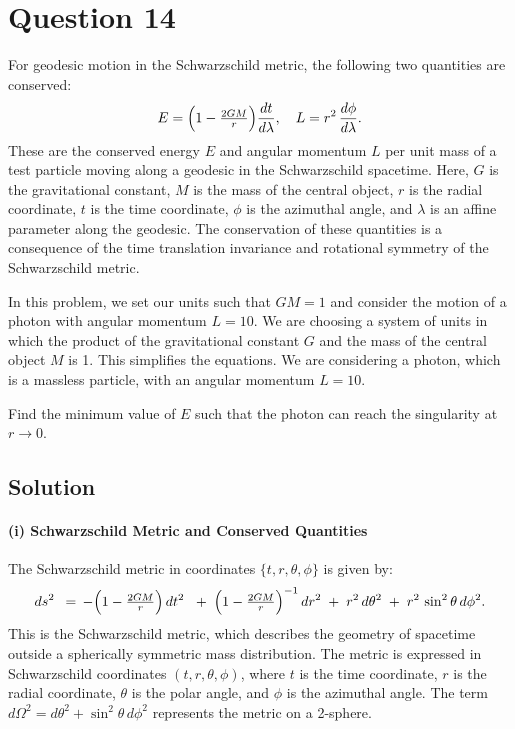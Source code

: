 \documentclass{article}
\begin{document}
\section*{Question 14}
For geodesic motion in the Schwarzschild metric, the following two quantities are conserved:
\[
E = \Bigl(1 - \tfrac{2GM}{r}\Bigr) \frac{dt}{d\lambda},
\quad
L = r^{2}\,\frac{d\phi}{d\lambda}.
\]
These are the conserved energy \(E\) and angular momentum \(L\) per unit mass of a test particle moving along a geodesic in the Schwarzschild spacetime. Here, \(G\) is the gravitational constant, \(M\) is the mass of the central object, \(r\) is the radial coordinate, \(t\) is the time coordinate, \(\phi\) is the azimuthal angle, and \(\lambda\) is an affine parameter along the geodesic. The conservation of these quantities is a consequence of the time translation invariance and rotational symmetry of the Schwarzschild metric.

In this problem, we set our units such that \(GM = 1\) and consider the motion of a photon with angular momentum \(L = 10\). We are choosing a system of units in which the product of the gravitational constant \(G\) and the mass of the central object \(M\) is 1. This simplifies the equations. We are considering a photon, which is a massless particle, with an angular momentum \(L=10\).

Find the minimum value of \(E\) such that the photon can reach the singularity at \(r \to 0\).

\subsection*{Solution}

\paragraph{(i) Schwarzschild Metric and Conserved Quantities}
The Schwarzschild metric in coordinates \(\{t, r, \theta, \phi\}\) is given by:
\[
ds^2 
\,=\, -\Bigl(1 - \tfrac{2GM}{r}\Bigr)\,dt^2 
\;+\; \Bigl(1 - \tfrac{2GM}{r}\Bigr)^{-1}\,dr^2
\;+\; r^2\,d\theta^2
\;+\; r^2\,\sin^2\theta\,d\phi^2.
\]
This is the Schwarzschild metric, which describes the geometry of spacetime outside a spherically symmetric mass distribution. The metric is expressed in Schwarzschild coordinates \((t, r, \theta, \phi)\), where \(t\) is the time coordinate, \(r\) is the radial coordinate, \(\theta\) is the polar angle, and \(\phi\) is the azimuthal angle. The term \(d\Omega^2 = d\theta^2 + \sin^2\theta\,d\phi^2\) represents the metric on a 2-sphere.
\end{document}
